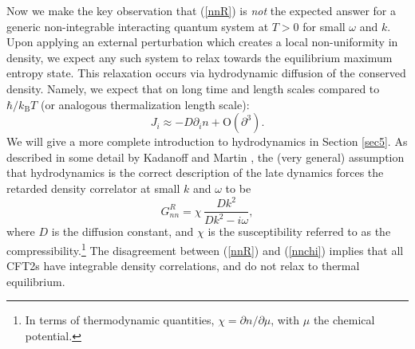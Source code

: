 \documentclass[10pt, oneside]{book}
\def\be{\begin{equation}}
\def\ee{\end{equation}}
\begin{document}
\begin{doublespace}
Now we make the key observation that (\ref{nnR}) is {\it not\/} the expected answer for a generic non-integrable interacting quantum system 
at $T > 0$ for small $\omega$ and $k$. 
Upon applying an external perturbation which creates a local non-uniformity in density, we expect any such system to relax
towards the equilibrium maximum entropy state. This relaxation occurs via hydrodynamic diffusion of the conserved density.   Namely, we expect that on long time and length scales compared to $\hbar/k_{\mathrm{B}}T$ (or analogous thermalization length scale):  \begin{equation}
J_i \approx -D\partial_i n  + \mathrm{O}(\partial^3).
\end{equation}
We will give a more complete introduction to hydrodynamics in Section \ref{sec5}.  As described in some detail
by Kadanoff and Martin \cite{Kadanoff1963419}, the (very general) assumption that hydrodynamics is the correct description of the late dynamics forces the retarded density correlator at small $k$ and $\omega$ to be
\be
G_{nn}^R = \chi \, \frac{ D k^2}{D k^2 - i \omega}, \label{nnchi}
\ee
where $D$ is the diffusion constant, and $\chi$ is the susceptibility referred to as the compressibility.\footnote{In terms of thermodynamic quantities, $\chi = \partial n/\partial \mu$, with $\mu$ the chemical potential.} The disagreement between (\ref{nnR}) and 
(\ref{nnchi}) implies that all CFT2s have integrable density correlations, and do not relax to thermal equilibrium.


\end{doublespace}
\end{document}
